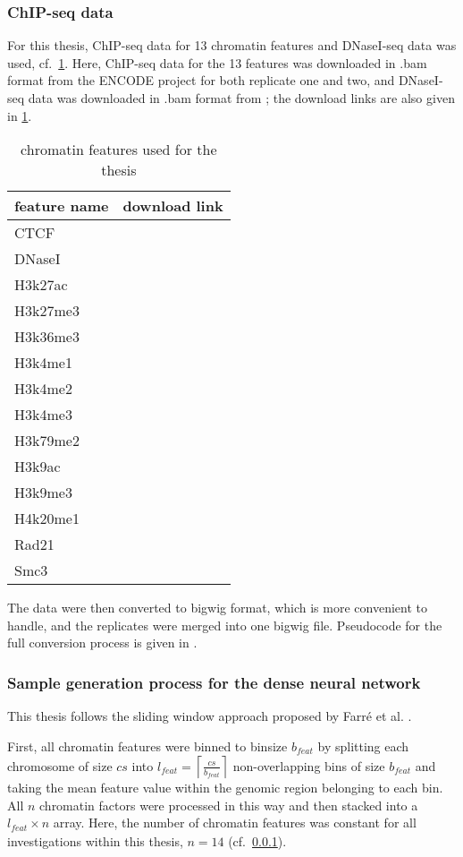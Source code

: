 \subsubsection{ChIP-seq data} \label{sec:methods:chipseq}
For this thesis, ChIP-seq data for 13 chromatin features and DNaseI-seq data was used, cf.~\cref{tab:methods:csdata}.
Here, ChIP-seq data for the 13 features was downloaded in .bam format from the ENCODE project \xxx for both replicate one and two,
and DNaseI-seq data was downloaded in .bam format from \xxx; the download links are also given in \cref{tab:methods:csdata}.
\begin{table}[ht!]
\centering
 \begin{tabular}{ll}
 \hline
  feature name & download link \\  \hline
  CTCF & \\
  DNaseI &\\
  H3k27ac & \\
  H3k27me3 &\\
  H3k36me3 &\\
  H3k4me1 &\\
  H3k4me2 &\\
  H3k4me3 &\\
  H3k79me2 &\\
  H3k9ac &\\
  H3k9me3 &\\
  H4k20me1 &\\
  Rad21 &\\
  Smc3 & \\ \hline
 \end{tabular}
 \caption{chromatin features used for the thesis} \label{tab:methods:csdata}
\end{table}

The data were then converted to bigwig format, which is more convenient to handle, and the replicates were merged into 
one bigwig file. Pseudocode for the full conversion process is given in \xxx.

\subsubsection{Sample generation process for the dense neural network} \label{sec:methods:sample_gen}
This thesis follows the sliding window approach proposed by Farr\'e et al. \cite{Farre2018a}.

First, all chromatin features were binned to binsize $b_\mathit{feat}$ by splitting each chromosome of size $cs$ into 
$l_\mathit{feat}=\left \lceil{\frac{cs}{b_\mathit{feat}}}\right \rceil$ non-overlapping bins of size $b_\mathit{feat}$
and taking the mean feature value within the genomic region belonging to each bin.
All $n$ chromatin factors were processed in this way and then stacked into a $l_\mathit{feat} \times n$ array.
Here, the number of chromatin features was constant for all investigations within this thesis, $n=14$ (cf.~\cref{sec:methods:chipseq}). 

